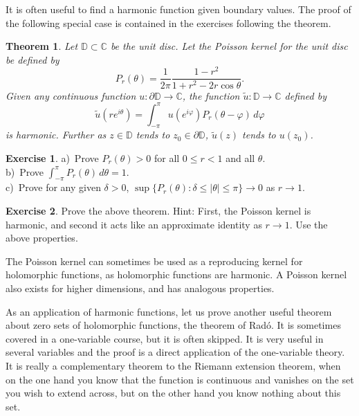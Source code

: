 \documentclass[12pt,openany]{book}
\newcommand{\abs}[1]{\left\lvert {#1} \right\rvert}
\newcommand{\C}{{\mathbb{C}}}
\newcommand{\D}{{\mathbb{D}}}
\newcommand{\myindex}[1]{#1\index{#1}}
\theoremstyle{plain}
\newtheorem{thm}{Theorem}[section]
\theoremstyle{remark}
\theoremstyle{definition}
\newenvironment{exbox}{%
    \def\FrameCommand{\vrule width 1pt \relax\hspace {10pt}}%
    \MakeFramed {\advance \hsize -\width \FrameRestore }%
}{%
    \endMakeFramed
}
\theoremstyle{exercise}
\newtheorem{exercise}{Exercise}[section]
\theoremstyle{example}
\begin{document}
It is often useful to find a harmonic function given boundary values.
The proof of the following special case is contained in the exercises
following the theorem.

\begin{thm}
Let $\D \subset \C$ be the unit disc.  Let the
\emph{\myindex{Poisson kernel}} for the unit disc be defined by
\begin{equation*}
P_r(\theta) = \frac{1}{2\pi} \frac{1-r^2}{1+r^2-2r \cos \theta} .
\end{equation*}
Given any continuous function $u \colon \partial \D \to \C$, the function
$\tilde{u} \colon \D \to \C$ defined by
\begin{equation}
\tilde{u}(re^{i\theta})
=
\int_{-\pi}^\pi u(e^{i\varphi}) P_r(\theta-\varphi) \, d\varphi
\end{equation}
is harmonic.  Further as $z \in \D$ tends to $z_0 \in \partial \D$,
$\tilde{u}(z)$ tends to $u(z_0)$.
\end{thm}

\begin{exbox}
\begin{exercise}
a)~Prove $P_r(\theta) > 0$ for all $0 \leq r < 1$ and all $\theta$.\\
b)~Prove $\int_{-\pi}^{\pi} P_r(\theta) \, d\theta = 1$.\\
c)~Prove for any given $\delta > 0$,
$\sup \{P_r(\theta) : \delta \leq \abs{\theta} \leq \pi \} \to 0$ as
$r \to 1$.
\end{exercise}

\begin{exercise}
Prove the above theorem.  Hint: First, the Poisson kernel is harmonic,
and second it acts like an
approximate identity as $r \to 1$.  Use the above properties.
\end{exercise}
\end{exbox}

The Poisson kernel can sometimes be used as a reproducing kernel for
holomorphic functions, as holomorphic functions are harmonic.
A Poisson kernel also exists for higher dimensions, and has
analogous properties.

As an application of harmonic functions, let us prove 
another useful theorem about zero sets of holomorphic functions,
the theorem of
Rad\'o.  It is sometimes covered in a one-variable course, but it is often
skipped.  It is very useful in several variables and the proof is a direct
application of the one-variable theory.
It is really a complementary theorem to the
Riemann extension theorem, when on the one hand you know that the function is
continuous and vanishes on the set you wish to extend across, but on the
other hand you know nothing about this set.
\end{document}
